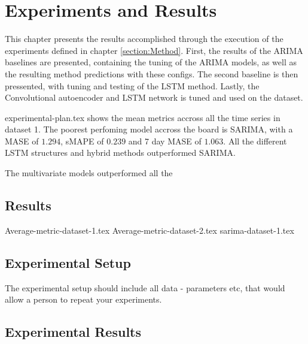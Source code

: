 \chapter{Experiments and Results}
\label{section:Results}

This chapter presents the results accomplished through the execution of the experiments defined in chapter \cref{section:Method}.
First, the results of the ARIMA baselines are presented, containing the tuning of the ARIMA models, as well as the resulting method predictions with these configs.
The second baseline is then pressented, with tuning and testing of the LSTM method.
Lastly, the Convolutional autoencoder and LSTM network is tuned and used on the dataset.


{experimental-plan.tex}
 shows the mean metrics accross
all the time series in dataset 1. The poorest perfoming model accross the board
is SARIMA, with a MASE of $1.294$, sMAPE of $0.239$ and 7 day MASE of $1.063$.
All the different LSTM structures and hybrid methods outperformed SARIMA.

The multivariate models outperformed all the




\section{Results}
{Average-metric-dataset-1.tex}
{Average-metric-dataset-2.tex}
{sarima-dataset-1.tex}



\iffalse

  \section{Experimental Setup}
  \label{sec:experimentalSetup}

  The experimental setup should include all data - parameters etc, that would allow a person to repeat your experiments.

  \section{Experimental Results}
  \label{sec:experimentalResults}

